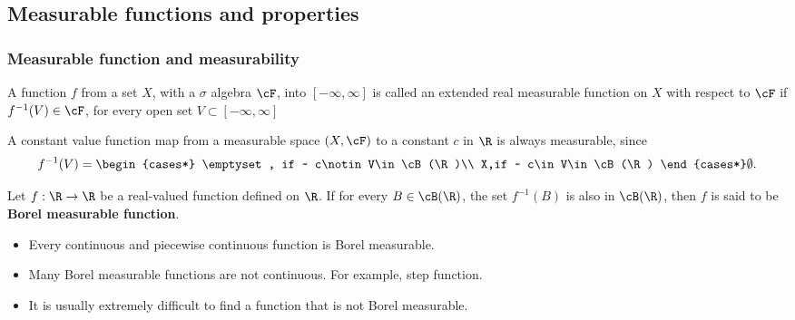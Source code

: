 \begin{refsection}
\subsection{Measurable functions and properties}
\subsubsection{Measurable function and measurability}
\begin{definition}
\cite[361]{johnsonbaugh2010foundations} A function $f$ from a set $X$, with a $\sigma$ algebra $\cF$, into $[-\infty,\infty]$ is called an extended real measurable function on $X$ with respect to $\cF$ if $f^{-1}(V)\in \cF$, for every open set $V\subset [-\infty,\infty]$
\end{definition}


\begin{example}
A constant value function map from a measurable space $(X,\cF)$ to a constant $c$ in $\R$ is always measurable, since 
$$f^{-1}(V) =\begin{cases*}
\emptyset, if ~ c\notin V\in \cB(\R)\\
X,if ~ c\in V\in \cB(\R)
\end{cases*} \emptyset.$$	
	
\end{example}

\begin{definition}\cite[21]{shreve2004stochastic2}
Let $f:\R\to \R$ be a real-valued function defined on $\R$. If for every $B\in \cB(\R)$, the set $f^{-1}(B)$ is also in $\cB(\R)$, then $f$ is said to be \textbf{Borel measurable function}.	
\end{definition}

\begin{remark}\hfill
\begin{itemize}
	\item Every continuous and piecewise continuous function is Borel measurable.
	\item Many Borel measurable functions are not continuous. For example, step function.
	\item It is usually extremely difficult to find a function that is not Borel measurable.
\end{itemize}	
\end{remark}


\end{refsection}

